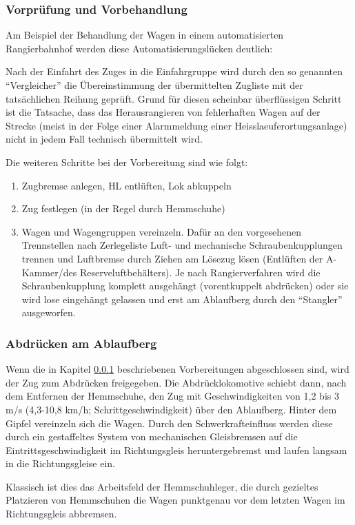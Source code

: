 \subsubsection{Vorprüfung und Vorbehandlung}\label{sec:Vorpruefung}
Am Beispiel der Behandlung der Wagen in einem automatisierten \gls{Rangierbahnhof} werden diese Automatisierungslücken deutlich:\par
Nach der Einfahrt des Zuges in die Einfahrgruppe wird durch den so genannten "`Vergleicher"' die Übereinstimmung der übermittelten Zugliste mit der tatsächlichen Reihung geprüft. Grund für diesen scheinbar überflüssigen Schritt ist die Tatsache, dass das Herausrangieren von fehlerhaften Wagen auf der Strecke (meist in der Folge einer Alarmmeldung einer \gls{Heisslaeuferortungsanlage}) nicht in jedem Fall technisch übermittelt wird.\par
Die weiteren Schritte bei der Vorbereitung sind wie folgt:
\begin{enumerate}
    \item Zugbremse anlegen, \acrshort{HL} entlüften, Lok abkuppeln
    \item Zug festlegen (in der Regel durch \gls{Hemmschuh}e)
    \item Wagen und Wagengruppen vereinzeln. Dafür an den vorgesehenen Trennstellen nach Zerlegeliste Luft- und mechanische Schraubenkupplungen trennen und Luftbremse durch Ziehen am Lösezug lösen (Entlüften der A-Kammer/des Reserveluftbehälters). Je nach Rangierverfahren wird die Schraubenkupplung komplett ausgehängt (vorentkuppelt abdrücken) oder sie wird lose eingehängt gelassen und erst am \gls{Ablaufberg} durch den "`Stangler"' ausgeworfen.
\end{enumerate}
\subsubsection{Abdrücken am Ablaufberg}\label{sec:Abdruecken}
Wenn die in Kapitel \ref{sec:Vorpruefung} beschriebenen Vorbereitungen abgeschlossen sind, wird der Zug zum Abdrücken freigegeben. Die Abdrücklokomotive schiebt dann, nach dem Entfernen der Hemmschuhe, den Zug mit Geschwindigkeiten von 1,2 bis 3 m/s (4,3-10,8 km/h; Schrittgeschwindigkeit) %
über den \gls{Ablaufberg}. Hinter dem Gipfel vereinzeln sich die Wagen. Durch den Schwerkrafteinfluss werden diese durch ein gestaffeltes System von mechanischen Gleisbremsen auf die Eintrittsgeschwindigkeit im Richtungsgleis heruntergebremst und laufen langsam in die Richtungsgleise ein.\par
Klassisch ist dies das Arbeitsfeld der Hemmschuhleger, die durch gezieltes Platzieren von Hemmschuhen die Wagen punktgenau vor dem letzten Wagen im Richtungsgleis abbremsen.
